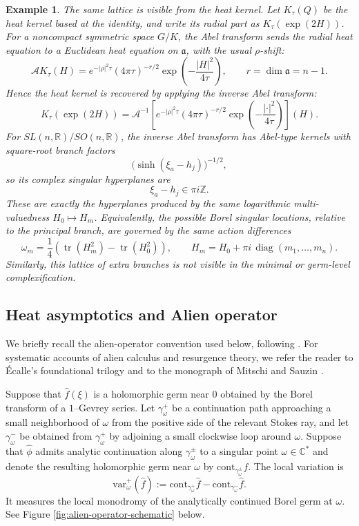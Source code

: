 \documentclass[11pt]{amsart}
\theoremstyle{plain}
\newtheorem{eg}[thm]{Example}
\theoremstyle{definition}
\newcommand{\R}{\mathbb{R}}
\newcommand{\C}{\mathbb{C}}
\newcommand{\var}{\text{var}}
\newcommand{\cont}{\text{cont}}
\begin{document}
\begin{eg}
The same lattice is visible from the heat kernel.  Let $K_\tau(Q)$ be the
heat kernel based at the identity, and write its radial part as
$K_\tau(\exp(2H))$.  For a noncompact symmetric space $G/K$, the Abel
transform sends the radial heat equation to a Euclidean heat equation on
$\mathfrak a$, with the usual $\rho$-shift:
\[
\mathcal A K_\tau(H)
=e^{-|\rho|^2\tau}
(4\pi\tau)^{-r/2}
\exp\left(-\frac{|H|^2}{4\tau}\right),
\qquad r=\dim\mathfrak a=n-1 .
\]
Hence the heat kernel is recovered by applying the inverse Abel transform:
\[
K_\tau(\exp(2H))
=\mathcal A^{-1}
\left[e^{-|\rho|^2\tau}
(4\pi\tau)^{-r/2}
\exp\left(-\frac{|\cdot|^2}{4\tau}\right)
\right](H).
\]
For $SL(n,\R)/SO(n,\R)$, the inverse Abel transform has
Abel-type kernels with square-root branch factors
\[
\bigl(\sinh(\xi_a-h_j)\bigr)^{-1/2},
\]
so its complex singular hyperplanes are
\[
\xi_a-h_j\in \pi i\mathbb Z.
\]
These are exactly the hyperplanes produced by the same logarithmic
multi-valuedness $H_0\mapsto H_m$.
Equivalently, the possible Borel singular locations, relative to
the principal branch, are governed by the same action differences
\[
\omega_m=\frac14\left(\operatorname{tr}(H_m^2)-\operatorname{tr}(H_0^2)\right),\qquad
H_m=H_0+\pi i\,\operatorname{diag}(m_1,\ldots,m_n).
\]
Similarly, this lattice of extra branches is not visible in the minimal or germ-level complexification.  
\end{eg}



\subsection{Heat asymptotics and Alien operator}\label{sec:heat-alien}

We briefly recall the alien-operator convention used below, following
\cite{LiLiTang2026}.  For systematic accounts of alien calculus and resurgence
theory, we refer the reader to Écalle's foundational trilogy
\cite{Ecalle1981I,Ecalle1981II,Ecalle1985III} and to the monograph of
Mitschi and Sauzin \cite{MitschiSauzin2016}. 

Suppose that $\widehat f(\xi)$ is a holomorphic germ near $0$ obtained by the Borel transform of a $1$--Gevrey series. Let $\gamma_\omega^+$ be a continuation path approaching a small
neighborhood of $\omega$ from the positive side of the relevant Stokes ray,
and let $\gamma_\omega^-$ be obtained from $\gamma_\omega^+$ by adjoining a
small clockwise loop around $\omega$. Suppose that $\widehat{\phi}$ admits analytic
continuation along $\gamma_\omega^{\pm}$ to a singular point $\omega\in\C^*$ and denote the resulting holomorphic germ near $\omega$ by $\cont_{\gamma_\omega^{\pm}} f$. The local variation is
\[
\var_{\omega}^+(\widehat f)
:=\cont_{\gamma_\omega^{+}}\widehat f-
\cont_{\gamma_\omega^{-}}\widehat f .
\]
It measures the local monodromy of the analytically continued Borel germ at $\omega$. See Figure \ref{fig:alien-operator-schematic} below.
\end{document}
